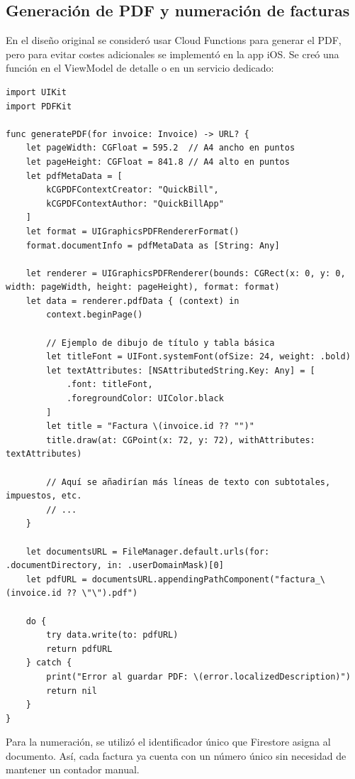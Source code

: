 \subsection{Generación de PDF y numeración de facturas}

\begin{large}

En el diseño original se consideró usar Cloud Functions para generar el PDF, pero para evitar costes adicionales se implementó en la app iOS. Se creó una función en el ViewModel de detalle o en un servicio dedicado:

\begin{verbatim}
import UIKit
import PDFKit

func generatePDF(for invoice: Invoice) -> URL? {
    let pageWidth: CGFloat = 595.2  // A4 ancho en puntos
    let pageHeight: CGFloat = 841.8 // A4 alto en puntos
    let pdfMetaData = [
        kCGPDFContextCreator: "QuickBill",
        kCGPDFContextAuthor: "QuickBillApp"
    ]
    let format = UIGraphicsPDFRendererFormat()
    format.documentInfo = pdfMetaData as [String: Any]

    let renderer = UIGraphicsPDFRenderer(bounds: CGRect(x: 0, y: 0, width: pageWidth, height: pageHeight), format: format)
    let data = renderer.pdfData { (context) in
        context.beginPage()
        
        // Ejemplo de dibujo de título y tabla básica
        let titleFont = UIFont.systemFont(ofSize: 24, weight: .bold)
        let textAttributes: [NSAttributedString.Key: Any] = [
            .font: titleFont,
            .foregroundColor: UIColor.black
        ]
        let title = "Factura \(invoice.id ?? "")"
        title.draw(at: CGPoint(x: 72, y: 72), withAttributes: textAttributes)
        
        // Aquí se añadirían más líneas de texto con subtotales, impuestos, etc.
        // ...
    }

    let documentsURL = FileManager.default.urls(for: .documentDirectory, in: .userDomainMask)[0]
    let pdfURL = documentsURL.appendingPathComponent("factura_\(invoice.id ?? \"\").pdf")
    
    do {
        try data.write(to: pdfURL)
        return pdfURL
    } catch {
        print("Error al guardar PDF: \(error.localizedDescription)")
        return nil
    }
}
\end{verbatim}

Para la numeración, se utilizó el identificador único que Firestore asigna al documento. Así, cada factura ya cuenta con un número único sin necesidad de mantener un contador manual.

\end{large}

